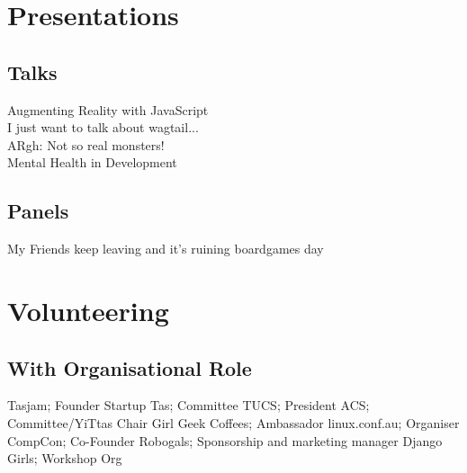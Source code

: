 \documentclass[a4paper]{deedy-resume} %
\begin{document}
\begin{minipage}[t]{0.33\textwidth}
\section{Presentations}

\subsection{Talks}
Augmenting Reality with JavaScript \\
I just want to talk about wagtail... \\
ARgh: Not so real monsters! \\
Mental Health in Development \\
\subsection{Panels}
My Friends keep leaving and it's ruining boardgames day \\

\sectionspace %


\section{Volunteering}

\subsection{With Organisational Role}
Tasjam; Founder \textbullet{} Startup Tas; Committee \textbullet{} TUCS; President \textbullet{}
ACS; Committee/YiTtas Chair \textbullet{} Girl Geek Coffees; Ambassador \textbullet{}
linux.conf.au; Organiser \textbullet{} CompCon; Co-Founder \textbullet{}
Robogals; Sponsorship and marketing manager \textbullet{} Django Girls; Workshop Org \\



\end{minipage}
\end{document}
